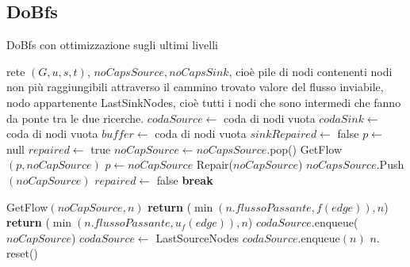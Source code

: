 \documentclass{article}
\begin{document}
\subsection{DoBfs}
\begin{algorithm}
    \caption{DoBfs con ottimizzazione sugli ultimi livelli}
    \begin{algorithmic}[1]
        \REQUIRE rete $(G,u,s,t)$, $noCapsSource, noCapsSink$, cioè pile di nodi contenenti nodi non più raggiungibili attraverso il cammino trovato
        \ENSURE valore del flusso inviabile, nodo appartenente LastSinkNodes, cioè tutti i nodi che sono intermedi che fanno da ponte tra le due ricerche.
        \STATE $codaSource \leftarrow$ coda di nodi vuota
        \STATE $codaSink \leftarrow$ coda di nodi vuota
        \STATE $buffer \leftarrow$ coda di nodi vuota
        \STATE $sinkRepaired \leftarrow$ false
        \STATE $p \leftarrow $ null
        \STATE $repaired \leftarrow $ true
        \STATE $noCapSource \leftarrow noCapsSource.$pop()
        \STATE GetFlow$(p,noCapSource)$
        \STATE $p \leftarrow noCapSource$
        \STATE Repair($noCapSource$)
        \STATE $noCapsSource.$Push$(noCapSource)$
        \STATE $repaired \leftarrow$ false
        \STATE \textbf{break}
        \ENDIF
        \ENDWHILE
    \end{algorithmic}
\end{algorithm}
\newpage
\begin{algorithm}
    \begin{algorithmic}
        \STATE GetFlow$(noCapSource,n)$ 
        \STATE \textbf{return} ($\min(n.flussoPassante,f(edge)),n$)
        \ELSE
        \STATE \textbf{return} ($\min(n.flussoPassante,u_f(edge)),n$)
        \ENDIF
        \ENDIF
        \ENDFOR
        \ENDIF
        \STATE $codaSource.$enqueue($noCapSource$)
        \STATE $codaSource \leftarrow$ LastSourceNodes 
        \ELSE
        \STATE $codaSource.$enqueue$(n) $
        \ENDFOR
        \STATE $n.$reset()
        \ENDFOR
        \ENDIF
        \ENDIF
        \ENDIF

    \end{algorithmic}
\end{algorithm}
\end{document}
